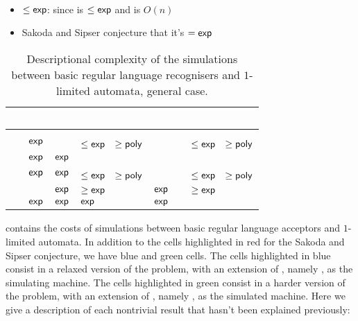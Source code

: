 \paragraph{\TNFA{}\tto\TDFA}
\begin{itemize}
	\item $\le\mathsf{exp}$: since \hyperref[cost:2NFAto1DFA]{\TNFA{}\tto\ODFA} is $\le\mathsf{exp}$ and \ODFA{}\tto\TDFA is $O(n)$
	\item Sakoda and Sipser conjecture that it's $=\mathsf{exp}$ \cite{SakSip78}
\end{itemize}


\begin{table}
	\centering
	\renewcommand{\hstdef}{.55}
	\begin{tabular}{|l|l|l|p{3.1em}|l|l|p{3.1em}|}
		\hline
		~     & \ODFA              & \ONFA   & \TDFA                                            & \TNFA   & \OLA   & \ODLA                                            \\ \hline
		\ODFA & \cY                & \Ctriv  & \Ctriv                                           & \Ctriv  & \Ctriv & \Ctriv                                           \\ \hline
		\ONFA & $\mathsf{exp}$            & \cY     & \cR $\le\Cexp\hst$ $\ge\mathsf{poly}$                   & \Ctriv  & \Ctriv & \cB $\le\Cexp\hst$ $\ge\mathsf{poly}$                   \\ \hline
		\TDFA & $\mathsf{exp}$            & $\mathsf{exp}$ & \cY                                              & \Ctriv  & \Ctriv & \Ctriv                                           \\ \hline
		\TNFA & $\mathsf{exp}$            & $\mathsf{exp}$ & \cR $\le\Cexp\hst$ $\ge\mathsf{poly}$                   & \cY     & \Ctriv & \cB $\le\Cexp\hst$ $\ge\mathsf{poly}$                   \\ \hline
		\OLA  & \rbt[.2]{$\Cdexp$} & $\mathsf{exp}$ & \cG \rbt[.2]{$\le\Cdexp\hst[.1]$} $\ge\Cexp\hst$ & $\mathsf{exp}$ & \cY    & \cG \rbt[.2]{$\le\Cdexp\hst[.1]$} $\ge\Cexp\hst$ \\ \hline
		\ODLA & $\mathsf{exp}$            & $\mathsf{exp}$ & $\mathsf{exp}$                                          & $\mathsf{exp}$ & \Ctriv & \cY                                              \\ \hline
	\end{tabular}
	\caption{Descriptional complexity of the simulations between basic regular language recognisers and $1$-limited automata, general case.}
	\label{tab:sims-1la-general}
\end{table}

 contains the costs of simulations between basic regular language acceptors and $1$-limited automata.
In addition to the cells highlighted in red for the Sakoda and Sipser conjecture, we have blue and green cells.
The cells highlighted in blue consist in a relaxed version of the problem, with an extension of \TNFA, namely \ODLA, as the simulating machine.
The cells highlighted in green consist in a harder version of the problem, with an extension of \NFA, namely \OLA, as the simulated machine.
Here we give a description of each nontrivial result that hasn't been explained previously:

